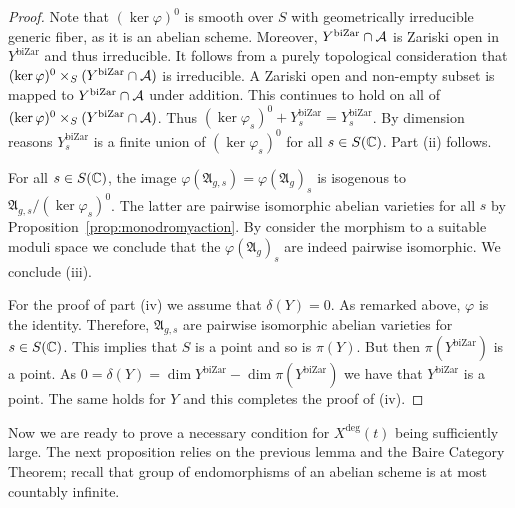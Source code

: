 \documentclass[12pt,oneside]{amsart}
\begin{document}
\begin{proof}
  Note that $(\ker\varphi)^0$ is smooth over $S$ with geometrically
  irreducible generic fiber, as it is an abelian
  scheme. Moreover, $Y^{\mathrm{biZar}}\cap \mathcal{A}$ is
  Zariski open in $Y^{\mathrm{biZar}}$ and thus irreducible. It follows
  from a purely topological consideration that $(\ker\varphi)^0\times_S (Y^{\mathrm{biZar}}\cap\mathcal{A})$ is
  irreducible. A Zariski open and non-empty subset is mapped to
  $Y^{\mathrm{biZar}}\cap\mathcal{A}$ under addition. This continues to hold on
  all of $(\ker\varphi)^0\times_S (Y^{\mathrm{biZar}}\cap\mathcal{A})$. Thus
  $(\ker\varphi_s)^0+Y^{\mathrm{biZar}}_s=Y^{\mathrm{biZar}}_s$. By
  dimension reasons
  $Y^{\mathrm{biZar}}_s$ is a finite union of $(\ker\varphi_s)^0$ for
  all $s\in S({\mathbb{C}})$. Part (ii) follows.
  
  For all $s\in S({\mathbb{C}})$, the image $\varphi(\mathfrak{A}_{g,s}) =
  \varphi(\mathfrak{A}_g)_s$ is isogenous to
  $\mathfrak{A}_{g,s}/(\ker\varphi_s)^0$. The latter are pairwise
  isomorphic abelian varieties for all $s$ by
  Proposition~\ref{prop:monodromyaction}. By consider the morphism to a
  suitable moduli space we conclude that the $\varphi(\mathfrak{A}_g)_s$
  are indeed pairwise isomorphic. We conclude (iii).

  For the proof of part (iv) we assume that $\delta(Y)=0$. As remarked
  above, $\varphi$ is the identity. Therefore,
  $\mathfrak{A}_{g,s}$ are pairwise isomorphic abelian varieties for
  $s\in S({\mathbb{C}})$. This implies that $S$ is a point and so is $\pi(Y)$.
  But then $\pi(Y^{\mathrm{biZar}})$ is a
  point. As $0=\delta(Y) = \dim Y^{\mathrm{biZar}} - \dim
  \pi(Y^{\mathrm{biZar}})$ we have that
  $Y^{\mathrm{biZar}}$ is a point. The same holds for $Y$ and this
  completes the proof of (iv). 
\end{proof}


Now we are ready to prove a necessary condition for
$X^{\mathrm{deg}}(t)$ being sufficiently large. The next proposition
relies on the previous lemma and the Baire Category Theorem; recall
that group of endomorphisms of an abelian scheme is at most countably
infinite. 
\end{document}
